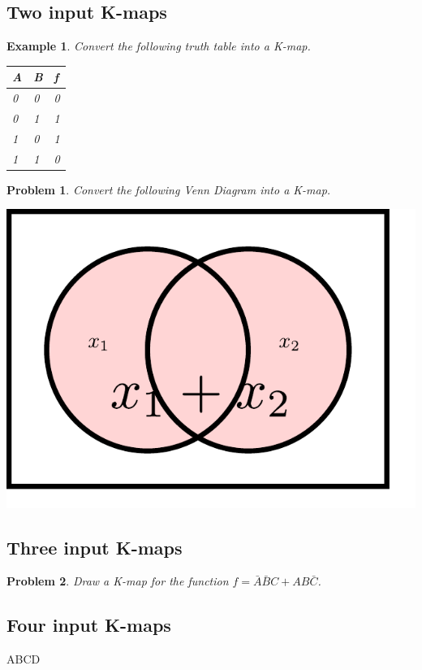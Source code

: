 \documentclass{article}
\newtheorem{example}{Example}
\newtheorem{prob}{Problem}
\begin{document}
\subsection{Two input K-maps}
\begin{Karnaughquatre}
\end{Karnaughquatre}

\begin{example}
  Convert the following truth table into a K-map.

  \noindent
  \begin{tabular}{ll|l}
    \toprule
     A & B & f \\
    \midrule
    0 & 0 & 0 \\ 
    0 & 1 & 1 \\ 
    1 & 0 & 1 \\ 
    1 & 1 & 0 \\ 
    \bottomrule
  \end{tabular}
\end{example}
\vspace{10em}

\begin{prob}
  Convert the following Venn Diagram into a K-map.

  \includegraphics[width=0.2\linewidth]{OR_Venn.pdf}
\end{prob}
\vspace{10em}
  
\subsection{Three input K-maps}

\begin{Karnaughvuit}
\end{Karnaughvuit}

\begin{prob}
  Draw a K-map for the function $f = \bar{A}\bar{B}C + AB\bar{C}$.
\end{prob}
\vspace{10em}

\subsection{Four input K-maps}
\begin{Karnaugh}{AB}{CD}
\end{Karnaugh}
\end{document}
